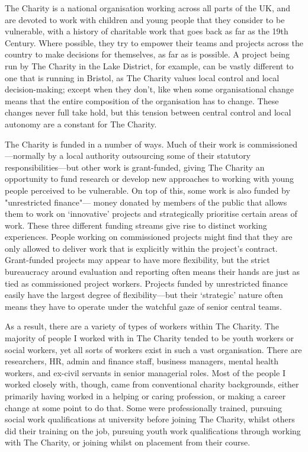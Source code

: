 The Charity is a national organisation working across all parts of the UK, and are devoted to work with children and young people that they consider to be vulnerable, with a history of charitable work that goes back as far as the 19th Century. Where possible, they try to empower their teams and projects across the country to make decisions for themselves, as far as is possible. A project being run by The Charity in the Lake District, for example, can be vastly different to one that is running in Bristol, as The Charity values local control and local decision-making; except when they don’t, like when some organisational change means that the entire composition of the organisation has to change. These changes never full take hold, but this tension between central control and local autonomy are a constant for The Charity.

The Charity is funded in a number of ways. Much of their work is commissioned—normally by a local authority outsourcing some of their statutory responsibilities—but other work is grant-funded, giving The Charity an opportunity to fund research or develop new approaches to working with young people perceived to be vulnerable. On top of this, some work is also funded by "unrestricted finance"— money donated by members of the public that allows them to work on `innovative' projects and strategically prioritise certain areas of work. These three different funding streams give rise to distinct working experiences. People working on commissioned projects might find that they are only allowed to deliver work that is explicitly within the project's contract. Grant-funded projects may appear to have more flexibility, but the strict bureaucracy around evaluation and reporting often means their hands are just as tied as commissioned project workers. Projects funded by unrestricted finance easily have the largest degree of flexibility—but their `strategic' nature often means they have to operate under the watchful gaze of senior central teams. 

As a result, there are a variety of types of workers within The Charity. The majority of people I worked with in The Charity tended to be youth workers or social workers, yet all sorts of workers exist in such a vast organisation. There are researchers, HR, admin and finance staff, business managers, mental health workers, and ex-civil servants in senior managerial roles. Most of the people I worked closely with, though, came from conventional charity backgrounds, either primarily having worked in a helping or caring profession, or making a career change at some point to do that. Some were professionally trained, pursuing social work qualifications at university before joining The Charity, whilst others did their training on the job, pursuing youth work qualifications through working with The Charity, or joining whilst on placement from their course. 

